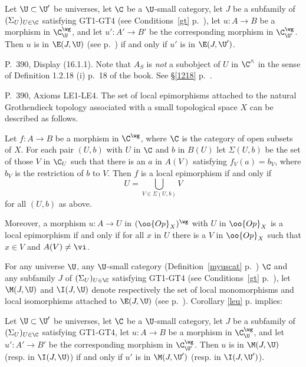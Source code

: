 \documentclass[12pt]{article}
\theoremstyle{remark}
\theoremstyle{definition}
\begin{document}
\begin{cor}
Let $\U\subset\U'$ be universes, let $\C$ be a $\U$-small category, let $J$ be a subfamily of $(\Sigma_U)_{U\in\C}$ satisfying GT1-GT4 (see Conditions~\ref{gt} p.~), let $u:A\to B$ be a morphism in $\C^\wg_\U$, and let $u':A'\to B'$ be the corresponding morphism in $\C^\wg_{\U'}$. Then $u$ is in $\E(J,\U)$ (see  p.~) if and only if $u'$ is in $\E(J,\U')$.
\end{cor}



\begin{s}
P.~390, Display (16.1.1). Note that $A_S$ is \emph{not} a subobject of $U$ in $\C^\wedge$ in the sense of Definition 1.2.18 (i) p.~18 of the book. See \S\ref{1218} p.~\pageref{1218}.
\end{s}

%

\begin{s}
P.~390, Axioms LE1-LE4. The set of local epimorphisms attached to the natural Grothendieck topology associated with a small topological space $X$ can be described as follows. 

Let $f:A\to B$ be a morphism in $\C^\wg$, where $\C$ is the category of open subsets of $X$. For each pair $(U,b)$ with $U$ in $\C$ and $b$ in $B(U)$ let $\Sigma(U,b)$ be the set of those $V$ in $\C_U$ such that there is an $a$ in $A(V)$ satisfying $f_V(a)=b_V$, where $b_V$ is the restriction of $b$ to $V$. Then $f$ is a local epimorphism if and only if 
$$
U=\bigcup_{V\in\Sigma(U,b)}V
$$ 
for all $(U,b)$ as above.

Moreover, a morphism $u:A\to U$ in $(\oo{Op}_X)^\wg$ with $U$ in $\oo{Op}_X$ is a local epimorphism if and only if for all $x$ in $U$ there is a $V$ in $\oo{Op}_X$ such that $x\in V$ and $A(V)\ne\vi$. 
\end{s}


\begin{s}
For any universe $\U$, any $\U$-small category (Definition~\ref{myuscat} p.~) $\C$ and any subfamily $J$ of $(\Sigma_U)_{U\in\C}$ satisfying GT1-GT4 (see Conditions~\ref{gt} p.~), let $\M(J,\U)$ and $\I(J,\U)$ denote respectively the set of local monomorphisms and local isomorphisms attached to $\E(J,\U)$ (see  p.~). Corollary \ref{leu} p.  implies:

Let $\U\subset\U'$ be universes, let $\C$ be a $\U$-small category, let $J$ be a subfamily of $(\Sigma_U)_{U\in\C}$ satisfying GT1-GT4, let $u:A\to B$ be a morphism in $\C^\wg_\U$, and let $u':A'\to B'$ be the corresponding morphism in $\C^\wg_{\U'}$. Then $u$ is in $\M(J,\U)$ (resp. in $\I(J,\U)$) if and only if $u'$ is in $\M(J,\U')$ (resp. in $\I(J,\U')$).
\end{s}
\end{document}
